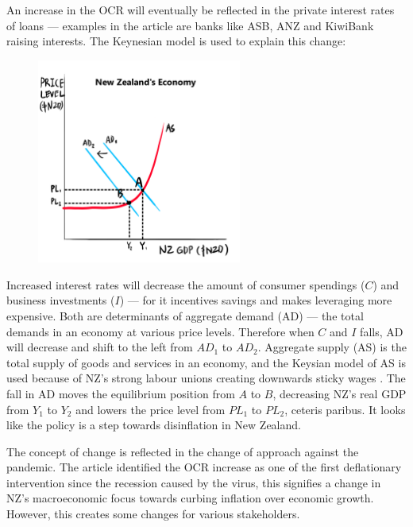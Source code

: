 \documentclass[a4paper,12pt]{article}
\begin{document}
An increase in the OCR will eventually be reflected in the private interest rates of loans --- examples in the article are banks like ASB, ANZ and KiwiBank raising interests. The Keynesian model is used to explain this change:

\begin{figure}[H]
    \centering
    \includegraphics[width=0.6\textwidth]{assets/macro.png}
\end{figure}

Increased interest rates will decrease the amount of consumer spendings ($C$) and business investments ($I$) --- for it incentives savings and makes leveraging more expensive. Both are determinants of aggregate demand (AD) --- the total demands in an economy at various price levels. Therefore when $C$ and $I$ falls, AD will decrease and shift to the left from $AD_1$ to $AD_2$. Aggregate supply (AS) is the total supply of goods and services in an economy, and the Keysian model of AS is used because of NZ's strong labour unions creating downwards sticky wages \parencite{labor}. The fall in AD moves the equilibrium position from $A$ to $B$, decreasing NZ's real GDP from $Y_1$ to $Y_2$ and lowers the price level from $PL_1$ to $PL_2$, ceteris paribus. It looks like the policy is a step towards disinflation in New Zealand.

The concept of change is reflected in the change of approach against the pandemic. The article identified the OCR increase as one of the first deflationary intervention since the recession caused by the virus, this signifies a change in NZ's macroeconomic focus towards curbing inflation over economic growth. However, this creates some changes for various stakeholders.
\end{document}
